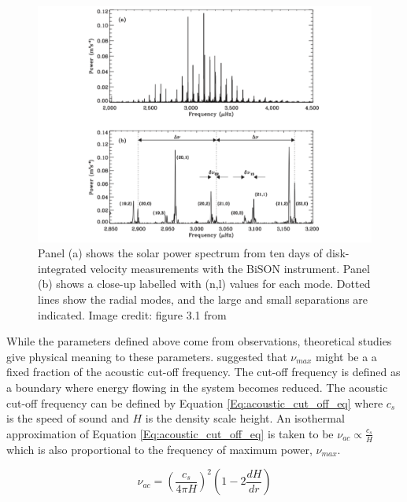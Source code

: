 \begin{figure}
    \centering
    \includegraphics[scale=0.5]{Figures/1-Introduction/power_spectrum_sun.pdf}
    \caption[Example of solar power spectrum from which asteroseismic analysis can be conducted]{Panel (a) shows the solar power spectrum from ten days of disk-integrated velocity measurements with the BiSON instrument. Panel (b) shows a close-up labelled with (n,l) values for each mode. Dotted lines show the radial modes, and the large and small separations are indicated. Image credit: figure 3.1 from \citet{Palle_Esteban_2014}}
    \label{fig:power_spectrum_example_sun}
\end{figure}

While the parameters defined above come from observations, theoretical studies give physical meaning to these parameters. \citet{Brown_etal_1991} suggested that $\nu_{max}$ might be a a fixed fraction of the acoustic cut-off frequency. The cut-off frequency is defined as a boundary where energy flowing in the system becomes reduced. The acoustic cut-off frequency can be defined by Equation \ref{Eq:acoustic_cut_off_eq} where $c_{s}$ is the speed of sound and $H$ is the density scale height. An isothermal approximation of Equation \ref{Eq:acoustic_cut_off_eq} is taken to be $\nu_{ac} \propto \frac{c_{s}}{H}$ which is also proportional to the frequency of maximum power, $\nu_{max}$.

\begin{equation}
    \nu_{ac} = \left(\frac{c_{s}}{4\pi H}\right)^{2}\left(1 - 2\frac{dH}{dr}\right)
    \label{Eq:acoustic_cut_off_eq}
\end{equation}

